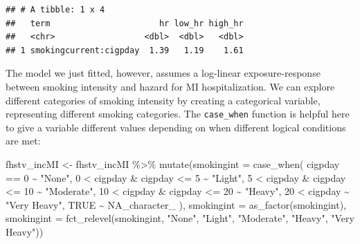 \documentclass[
]{book}
\newenvironment{Shaded}{\begin{snugshade}}{\end{snugshade}}
\newcommand{\AttributeTok}[1]{\textcolor[rgb]{0.77,0.63,0.00}{#1}}
\newcommand{\ConstantTok}[1]{\textcolor[rgb]{0.00,0.00,0.00}{#1}}
\newcommand{\DecValTok}[1]{\textcolor[rgb]{0.00,0.00,0.81}{#1}}
\newcommand{\FunctionTok}[1]{\textcolor[rgb]{0.00,0.00,0.00}{#1}}
\newcommand{\NormalTok}[1]{#1}
\newcommand{\OtherTok}[1]{\textcolor[rgb]{0.56,0.35,0.01}{#1}}
\newcommand{\SpecialCharTok}[1]{\textcolor[rgb]{0.00,0.00,0.00}{#1}}
\newcommand{\StringTok}[1]{\textcolor[rgb]{0.31,0.60,0.02}{#1}}
\begin{document}
\begin{verbatim}
## # A tibble: 1 x 4
##   term                      hr low_hr high_hr
##   <chr>                  <dbl>  <dbl>   <dbl>
## 1 smokingcurrent:cigpday  1.39   1.19    1.61
\end{verbatim}

The model we just fitted, however, assumes a log-linear exposure-response between smoking intensity and hazard for MI hospitalization. We can explore different categories of smoking intensity by creating a categorical variable, representing different smoking categories. The \texttt{case\_when} function is helpful here to give a variable different values depending on when different logical conditions are met:

\begin{Shaded}
\begin{Highlighting}[]
\NormalTok{fhstv\_incMI }\OtherTok{\textless{}{-}}\NormalTok{ fhstv\_incMI }\SpecialCharTok{\%\textgreater{}\%} 
  \FunctionTok{mutate}\NormalTok{(}\AttributeTok{smokingint =} \FunctionTok{case\_when}\NormalTok{(}
\NormalTok{    cigpday }\SpecialCharTok{==} \DecValTok{0} \SpecialCharTok{\textasciitilde{}} \StringTok{"None"}\NormalTok{, }
    \DecValTok{0} \SpecialCharTok{\textless{}}\NormalTok{ cigpday }\SpecialCharTok{\&}\NormalTok{ cigpday }\SpecialCharTok{\textless{}=} \DecValTok{5} \SpecialCharTok{\textasciitilde{}} \StringTok{"Light"}\NormalTok{, }
    \DecValTok{5} \SpecialCharTok{\textless{}}\NormalTok{ cigpday }\SpecialCharTok{\&}\NormalTok{ cigpday }\SpecialCharTok{\textless{}=} \DecValTok{10} \SpecialCharTok{\textasciitilde{}} \StringTok{"Moderate"}\NormalTok{, }
    \DecValTok{10} \SpecialCharTok{\textless{}}\NormalTok{ cigpday }\SpecialCharTok{\&}\NormalTok{ cigpday }\SpecialCharTok{\textless{}=} \DecValTok{20} \SpecialCharTok{\textasciitilde{}} \StringTok{"Heavy"}\NormalTok{, }
    \DecValTok{20} \SpecialCharTok{\textless{}}\NormalTok{ cigpday }\SpecialCharTok{\textasciitilde{}} \StringTok{"Very Heavy"}\NormalTok{,}
    \ConstantTok{TRUE} \SpecialCharTok{\textasciitilde{}} \ConstantTok{NA\_character\_}
\NormalTok{                                ),}
    \AttributeTok{smokingint =} \FunctionTok{as\_factor}\NormalTok{(smokingint), }
    \AttributeTok{smokingint =} \FunctionTok{fct\_relevel}\NormalTok{(smokingint, }
                          \StringTok{"None"}\NormalTok{, }\StringTok{"Light"}\NormalTok{, }\StringTok{"Moderate"}\NormalTok{, }\StringTok{"Heavy"}\NormalTok{, }\StringTok{"Very Heavy"}\NormalTok{))}
\end{Highlighting}
\end{Shaded}
\end{document}
